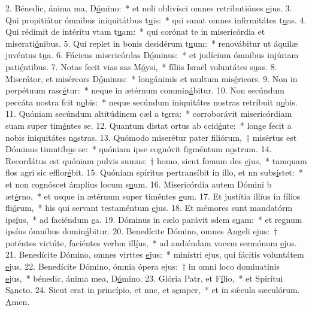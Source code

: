 2. Bénedic, ánima ma, D\uline{ó}mino:~* et noli oblivísci omnes retributiónes \uline{e}jus.
3. Qui propitiátur ómnibus iniquitátbus t\uline{u}is:~* qui sanat omnes infirmitátes t\uline{u}as.
4. Qui rédimit de intéritu vtam t\uline{u}am:~* qui corónat te in misericórdia et miserati\uline{ó}nibus.
5. Qui replet in bonis desidérum t\uline{u}um:~* renovábitur ut áquilæ juvéntus t\uline{u}a.
6. Fáciens misericórdas D\uline{ó}minus:~* et judícium ómnibus injúriam pati\uline{é}ntibus.
7. Notas fecit vias sas M\uline{ó}ysi,~* fíliis Israël voluntátes s\uline{u}as.
8. Miserátor, et misércors D\uline{ó}minus:~* longánimis et multum mis\uline{é}ricors.
9. Non in perpétuum rasc\uline{é}tur:~* neque in ætérnum commin\uline{á}bitur.
10. Non secúndum peccáta nostra fcit n\uline{o}bis:~* neque secúndum iniquitátes nostras retríbuit n\uline{o}bis.
11. Quóniam secúndum altitúdinem cæl a t\uline{e}rra:~* corroborávit misericórdiam suam super tim\uline{é}ntes se.
12. Quantum distat ortus ab ccid\uline{é}nte:~* longe fecit a nobis iniquitátes n\uline{o}stras.
13. Quómodo miserétur pater filiórum,~† misértus est Dóminus timntib\uline{u}s se:~* quóniam ipse cognóvit figméntum n\uline{o}strum.
14. Recordátus est quóniam pulvis sumus:~† homo, sicut fœnum des \uline{e}jus,~* tamquam flos agri sic efflor\uline{é}bit.
15. Quóniam spíritus pertransíbit in illo, et nn subs\uline{í}stet:~* et non cognóscet ámplius locum s\uline{u}um.
16. Misericórdia autem Dómini b æt\uline{é}rno,~* et usque in ætérnum super timéntes \uline{e}um.
17. Et justítia illíus in fílios fli\uline{ó}rum,~* his qui servant testaméntum \uline{e}jus.
18. Et mémores sunt mandatórm ips\uline{í}us,~* ad faciéndum \uline{e}a.
19. Dóminus in cælo parávit sdem s\uline{u}am:~* et regnum ipsíus ómnibus domin\uline{á}bitur.
20. Benedícite Dómino, omnes Angeli ejus:~† poténtes virtúte, faciéntes verbm ill\uline{í}us,~* ad audiéndam vocem sermónum \uline{e}jus.
21. Benedícite Dómino, omnes virttes \uline{e}jus:~* minístri ejus, qui fácitis voluntátem \uline{e}jus.
22. Benedícite Dómino, ómnia ópera ejus:~† in omni loco dominatinis \uline{e}jus,~* bénedic, ánima mea, D\uline{ó}mino.
23. Glória Patr, et F\uline{í}lio,~* et Spirítui S\uline{a}ncto.
24. Sicut erat in princípio, et nnc, et s\uline{e}mper,~* et in sǽcula sæculórum. \uline{A}men.

